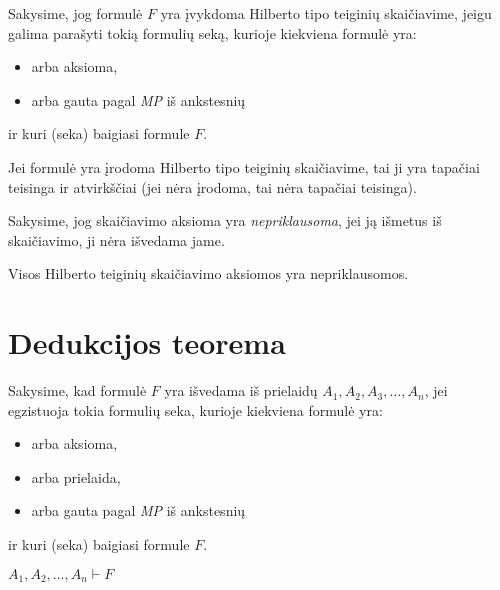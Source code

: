 Sakysime, jog formulė $F$ yra įvykdoma Hilberto tipo teiginių skaičiavime,
jeigu galima parašyti tokią formulių seką, kurioje kiekviena formulė yra:
\begin{itemize}
  \item arba aksioma,
  \item arba gauta pagal \emph{MP} iš ankstesnių
\end{itemize}
ir kuri (seka) baigiasi formule $F$.

\begin{prop}
  Jei formulė yra įrodoma Hilberto tipo teiginių skaičiavime, tai ji yra
  tapačiai teisinga ir atvirkščiai (jei nėra įrodoma, tai nėra tapačiai
  teisinga).
\end{prop}

Sakysime, jog skaičiavimo aksioma yra \emph{nepriklausoma}, jei ją išmetus
iš skaičiavimo, ji nėra išvedama jame.

Visos Hilberto teiginių skaičiavimo aksiomos yra nepriklausomos.

\section{Dedukcijos teorema}

Sakysime, kad formulė $F$ yra išvedama iš prielaidų 
$A_{1},A_{2},A_{3},\dots,A_{n}$, jei egzistuoja tokia formulių seka, 
kurioje kiekviena formulė yra:
\begin{itemize}
  \item arba aksioma,
  \item arba prielaida,
  \item arba gauta pagal \emph{MP} iš ankstesnių
\end{itemize}
ir kuri (seka) baigiasi formule $F$.
\begin{notation}
  $A_{1},A_{2},\dots,A_{n} \vdash F$
\end{notation}

